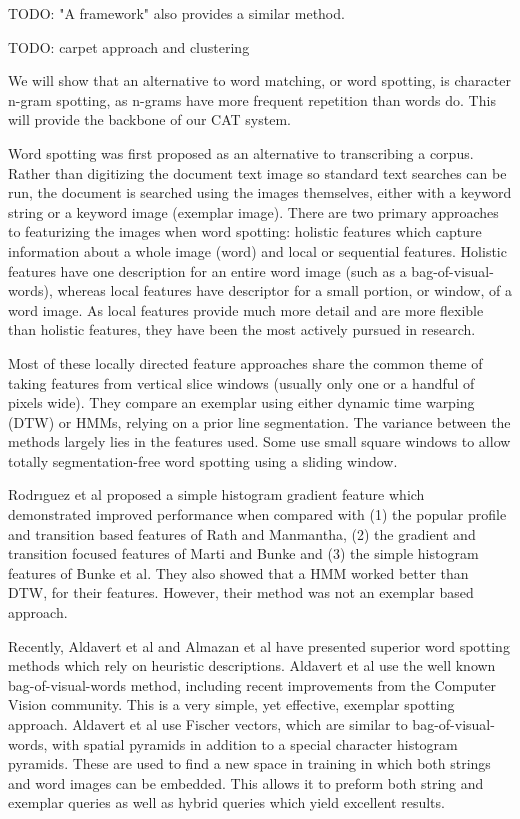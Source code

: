\documentclass[ms]{byuprop}
\begin{document}
TODO: "A framework" also provides a similar method.

TODO: carpet approach and clustering

We will show that an alternative to word matching, or word spotting, is character n-gram spotting, as n-grams have more frequent repetition than words do. This will provide the backbone of our CAT system.

Word spotting was first proposed as an alternative to transcribing a corpus. Rather than digitizing the document text image so standard text searches can be run, the document is searched using the images themselves, either with a keyword string or a keyword image (exemplar image). There are two primary approaches to featurizing the images when word spotting: holistic features which capture information about a whole image (word) and local or sequential features\cite{Rodrıguez2008}. Holistic features have one description for an entire word image (such as a bag-of-visual-words), whereas local features have descriptor for a small portion, or window, of a word image. As local features provide much more detail and are more flexible than holistic features, they have been the most actively pursued in research.

Most of these locally directed feature approaches share the common theme of taking features from vertical slice windows (usually only one or a handful of pixels wide). They compare an exemplar using either dynamic time warping (DTW) or HMMs, relying on a prior line segmentation. The variance between the methods largely lies in the features used. Some use small square windows to allow totally segmentation-free word spotting using a sliding window\cite{Rothacker2013}.

Rodr{\i}guez et al\cite{Rodrıguez2008} proposed a simple histogram gradient feature which demonstrated improved performance when compared with (1) the popular profile and transition based features of Rath and Manmantha\cite{Rath2003}, (2) the gradient and transition focused features of Marti and Bunke\cite{Marti2001} and (3) the simple histogram features of Bunke et al\cite{Bunke2004}. They also showed that a HMM worked better than DTW, for their features. However, their method was not an exemplar based approach.

Recently, Aldavert et al\cite{Aldavert2015} and Almazan et al\cite{Almazan2014} have presented superior word spotting methods which rely on heuristic descriptions. Aldavert et al use the well known bag-of-visual-words method, including recent improvements from the Computer Vision community. This is a very simple, yet effective, exemplar spotting approach. Aldavert et al use Fischer vectors, which are similar to bag-of-visual-words, with spatial pyramids in addition to a special character histogram pyramids. These are used to find a new space in training in which both strings and word images can be embedded. This allows it to preform both string and exemplar queries as well as hybrid queries which yield excellent results.
\end{document}
